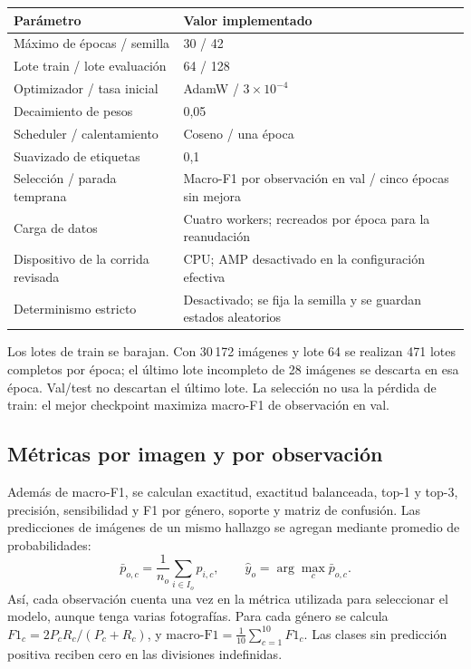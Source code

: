 \documentclass[11pt,a4paper]{article}
\begin{document}
\begin{center}
\small
\begin{tabularx}{\textwidth}{p{5.4cm}Y}
\toprule
\textbf{Parámetro} & \textbf{Valor implementado}\\
\midrule
Máximo de épocas / semilla & 30 / 42\\
Lote train / lote evaluación & 64 / 128\\
Optimizador / tasa inicial & AdamW / \(3\times10^{-4}\)\\
Decaimiento de pesos & 0,05\\
Scheduler / calentamiento & Coseno / una época\\
Suavizado de etiquetas & 0,1\\
Selección / parada temprana & Macro-F1 por observación en val / cinco épocas sin mejora\\
Carga de datos & Cuatro workers; recreados por época para la reanudación\\
Dispositivo de la corrida revisada & CPU; AMP desactivado en la configuración efectiva\\
Determinismo estricto & Desactivado; se fija la semilla y se guardan estados aleatorios\\
\bottomrule
\end{tabularx}
\end{center}

Los lotes de train se barajan. Con 30\,172 imágenes y lote 64 se realizan
471 lotes completos por época; el último lote incompleto de 28 imágenes se
descarta en esa época. Val/test no descartan el último lote. La selección no
usa la pérdida de train: el mejor checkpoint maximiza macro-F1 de observación en val.

\subsection{Métricas por imagen y por observación}

Además de macro-F1, se calculan exactitud, exactitud balanceada, top-1 y top-3,
precisión, sensibilidad y F1 por género, soporte y matriz de confusión.
Las predicciones de imágenes de un mismo hallazgo se agregan mediante promedio
de probabilidades:
\[
\bar p_{o,c}=\frac{1}{n_o}\sum_{i\in I_o}p_{i,c},
\qquad \hat y_o=\arg\max_c\bar p_{o,c}.
\]
Así, cada observación cuenta una vez en la métrica utilizada para seleccionar el
modelo, aunque tenga varias fotografías. Para cada género se calcula
\(F1_c=2P_cR_c/(P_c+R_c)\), y
\(\mathrm{macro\text{-}F1}=\frac{1}{10}\sum_{c=1}^{10}F1_c\).
Las clases sin predicción positiva reciben cero en las divisiones indefinidas.
\end{document}
